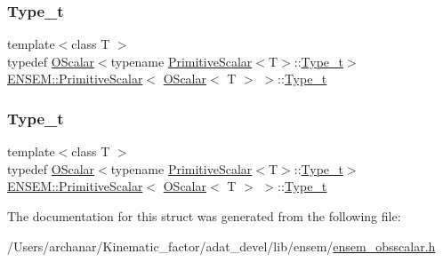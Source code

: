 \subsubsection{\texorpdfstring{Type\_t}{Type\_t}\hspace{0.1cm}{\footnotesize\ttfamily [1/2]}}
{\footnotesize\ttfamily template$<$class T $>$ \\
typedef \mbox{\hyperlink{classENSEM_1_1OScalar}{O\+Scalar}}$<$typename \mbox{\hyperlink{structENSEM_1_1PrimitiveScalar}{Primitive\+Scalar}}$<$T$>$\+::\mbox{\hyperlink{structENSEM_1_1PrimitiveScalar_3_01OScalar_3_01T_01_4_01_4_a04f9a62c0498189e4c514dce6a7baa36}{Type\+\_\+t}}$>$ \mbox{\hyperlink{structENSEM_1_1PrimitiveScalar}{E\+N\+S\+E\+M\+::\+Primitive\+Scalar}}$<$ \mbox{\hyperlink{classENSEM_1_1OScalar}{O\+Scalar}}$<$ T $>$ $>$\+::\mbox{\hyperlink{structENSEM_1_1PrimitiveScalar_3_01OScalar_3_01T_01_4_01_4_a04f9a62c0498189e4c514dce6a7baa36}{Type\+\_\+t}}}

\mbox{\label{structENSEM_1_1PrimitiveScalar_3_01OScalar_3_01T_01_4_01_4_a04f9a62c0498189e4c514dce6a7baa36}} 
\subsubsection{\texorpdfstring{Type\_t}{Type\_t}\hspace{0.1cm}{\footnotesize\ttfamily [2/2]}}
{\footnotesize\ttfamily template$<$class T $>$ \\
typedef \mbox{\hyperlink{classENSEM_1_1OScalar}{O\+Scalar}}$<$typename \mbox{\hyperlink{structENSEM_1_1PrimitiveScalar}{Primitive\+Scalar}}$<$T$>$\+::\mbox{\hyperlink{structENSEM_1_1PrimitiveScalar_3_01OScalar_3_01T_01_4_01_4_a04f9a62c0498189e4c514dce6a7baa36}{Type\+\_\+t}}$>$ \mbox{\hyperlink{structENSEM_1_1PrimitiveScalar}{E\+N\+S\+E\+M\+::\+Primitive\+Scalar}}$<$ \mbox{\hyperlink{classENSEM_1_1OScalar}{O\+Scalar}}$<$ T $>$ $>$\+::\mbox{\hyperlink{structENSEM_1_1PrimitiveScalar_3_01OScalar_3_01T_01_4_01_4_a04f9a62c0498189e4c514dce6a7baa36}{Type\+\_\+t}}}



The documentation for this struct was generated from the following file\+:\begin{DoxyCompactItemize}
\item 
/\+Users/archanar/\+Kinematic\+\_\+factor/adat\+\_\+devel/lib/ensem/\mbox{\hyperlink{lib_2ensem_2ensem__obsscalar_8h}{ensem\+\_\+obsscalar.\+h}}\end{DoxyCompactItemize}
